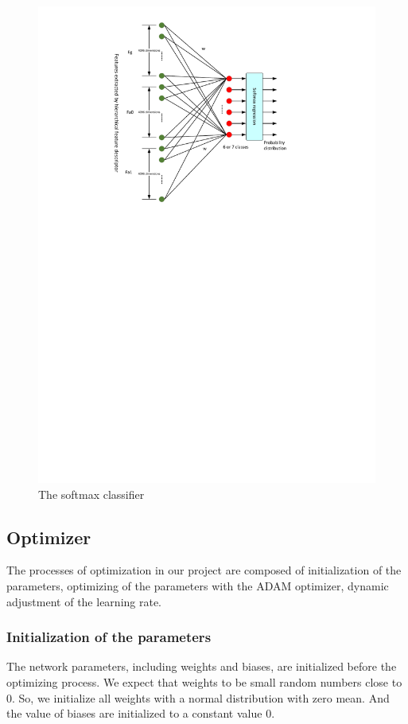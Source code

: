 \begin{figure}
	\includegraphics[trim=2cm 17cm 0cm 1cm]{fig01/softmax.pdf}
	\caption{The softmax classifier}
	\label{fig:softmax}
\end{figure}

\subsection{Optimizer}
The processes of optimization in our project are composed of initialization of the parameters, optimizing of the parameters  with the ADAM optimizer, dynamic adjustment of the learning rate. 
\subsubsection*{Initialization of the parameters}
\label{Initialization}
The network parameters, including weights and biases, are initialized before the optimizing process. We expect that weights to be small random numbers close to \(0\). So, we initialize all weights with a normal distribution with zero mean. And the value of biases are initialized to a constant value 0.  
